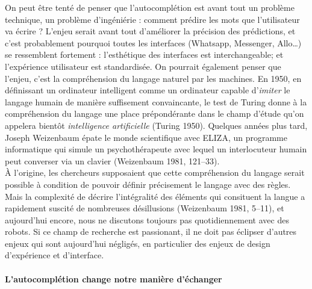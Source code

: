 \documentclass[]{article}
\let\oldparagraph\paragraph
\renewcommand{\paragraph}[1]{\oldparagraph{#1}\mbox{}}
\begin{document}
On peut être tenté de penser que l'autocomplétion est avant tout un
problème technique, un problème d'ingéniérie : comment prédire les mots
que l'utilisateur va écrire ? L'enjeu serait avant tout d'améliorer la
précision des prédictions, et c'est probablement pourquoi toutes les
interfaces (Whatsapp, Messenger, Allo\ldots{}) se ressemblent fortement
: l'esthétique des interfaces est interchangeable; et l'expérience
utilisateur est standardisée. On pourrait également penser que l'enjeu,
c'est la compréhension du langage naturel par les machines. En 1950, en
définissant un ordinateur intelligent comme un ordinateur capable
d'\emph{imiter} le langage humain de manière suffisement convaincante,
le test de Turing donne à la compréhension du langage une place
prépondérante dans le champ d'étude qu'on appelera bientôt
\emph{intelligence artificielle} (Turing 1950). Quelques années plus
tard, Joseph Weizenbaum épate le monde scientifique avec ELIZA, un
programme informatique qui simule un psychothérapeute avec lequel un
interlocuteur humain peut converser via un clavier (Weizenbaum 1981,
121--33).\\
À l'origine, les chercheurs supposaient que cette compréhension du
langage serait possible à condition de pouvoir définir précisement le
langage avec des règles. Mais la complexité de décrire l'intégralité des
éléments qui consituent la langue a rapidement suscité de nombreuses
désillusions (Weizenbaum 1981, 5--11), et aujourd'hui encore, nous ne
discutons toujours pas quotidiennement avec des robots. Si ce champ de
recherche est passionant, il ne doit pas éclipser d'autres enjeux qui
sont aujourd'hui négligés, en particulier des enjeux de design
d'expérience et d'interface.

\hypertarget{lautocompluxe9tion-change-notre-maniuxe8re-duxe9changer}{%
\paragraph{L'autocomplétion change notre manière
d'échanger}\label{lautocompluxe9tion-change-notre-maniuxe8re-duxe9changer}}
\end{document}
